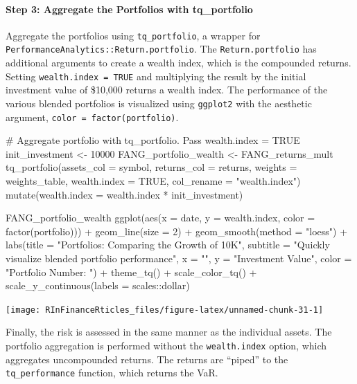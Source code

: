 \hspace{20 mm}

\paragraph{Step 3: Aggregate the Portfolios with
tq\_portfolio}\label{step-3-aggregate-the-portfolios-with-tq_portfolio}

Aggregate the portfolios using \texttt{tq\_portfolio}, a wrapper for
\texttt{PerformanceAnalytics::Return.portfolio}. The
\texttt{Return.portfolio} has additional arguments to create a wealth
index, which is the compounded returns. Setting
\texttt{wealth.index\ =\ TRUE} and multiplying the result by the initial
investment value of \$10,000 returns a wealth index. The performance of
the various blended portfolios is visualized using \texttt{ggplot2} with
the aesthetic argument, \texttt{color\ =\ factor(portfolio)}.

\begin{Schunk}
\begin{Sinput}
# Aggregate portfolio with tq_portfolio. Pass wealth.index = TRUE
init_investment <- 10000
FANG_portfolio_wealth <- FANG_returns_mult %
    tq_portfolio(assets_col = symbol, returns_col = returns,
                 weights = weights_table, wealth.index = TRUE,
                 col_rename = "wealth.index") %
    mutate(wealth.index = wealth.index * init_investment)

FANG_portfolio_wealth  %
    ggplot(aes(x = date, y = wealth.index, color = factor(portfolio))) +
    geom_line(size = 2) +
    geom_smooth(method = "loess") +
    labs(title = "Portfolios: Comparing the Growth of 10K",
         subtitle = "Quickly visualize blended portfolio performance",
         x = "", y = "Investment Value",
         color = "Portfolio Number: ") +
    theme_tq() +
    scale_color_tq() +
    scale_y_continuous(labels = scales::dollar)
\end{Sinput}


\begin{center}\texttt{[image: RInFinanceRticles\_files/figure-latex/unnamed-chunk-31-1]} \end{center}

\end{Schunk}

Finally, the risk is assessed in the same manner as the individual
assets. The portfolio aggregation is performed without the
\texttt{wealth.index} option, which aggregates uncompounded returns. The
returns are ``piped'' to the \texttt{tq\_performance} function, which
returns the VaR.

